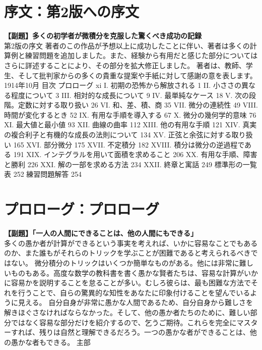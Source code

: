 \documentclass[a4paper,11pt,openany]{ltjsbook}
\begin{document}
\chapter*{序文：第2版への序文}
\noindent\textbf{\large 【副題】多くの初学者が微積分を克服した驚くべき成功の記録}\\[4mm]
第2版の序文
著者のこの作品が予想以上に成功したことに伴い、著者は多くの計算例と練習問題を追加しました。また、経験から有用だと感じた部分についてはさらに詳述することにより、その部分を拡大修正しました。
著者は、教師、学生、そして批判家からの多くの貴重な提案や手紙に対して感謝の意を表します。
1914年10月
\cleardoublepage
目次
プロローグ xi
I. 初期の恐怖から解放される 1
II. 小ささの異なる程度について 3
III. 相対的な成長について 9
IV. 最単純なケース 18
V. 次の段階。定数に対する取り扱い 26
VI. 和、差、積、商 35
VII. 微分の連続性 49
VIII. 時間が変化するとき 52
IX. 有用な手順を導入する 67
X. 微分の幾何学的意味 76
XI. 最大値と最小値 93
XII. 曲線の曲率 112
XIII. 他の有用な手順 121
XIV. 真実の複合利子と有機的な成長の法則について 134
XV. 正弦と余弦に対する取り扱い 165
XVI. 部分微分 175
XVII. 不定積分 182
XVIII. 積分は微分の逆過程である 191
XIX. インテグラルを用いて面積を求めること 206
XX. 有用な手順、障害と勝利 226
XXI. 解の一部を求める方法 234
XXII. 終章と寓話 249
標準形の一覧表 252
練習問題解答 254
\chapter*{プロローグ：プロローグ}
\noindent\textbf{\large 【副題】「一人の人間にできることは、他の人間にもできる」}\\[4mm]
多くの愚か者が計算ができるという事実を考えれば、いかに容易なことでもあるのか、また誰もがそれらのトリックを学ぶことが困難であると考えられるべきではない。
微分積分のトリックはいくつか簡単なものがある。他には非常に難しいものもある。高度な数学の教科書を書く愚かな賢者たちは、容易な計算がいかに容易かを説明することを怠ることが多い。むしろ彼らは、最も困難な方法でそれを行うことで、自らの驚異的な知性をあなたに印象付けることを望んでいるように見える。
自分自身が非常に愚かな人間であるため、自分自身から難しさを解きほぐさなければならなかった。そして、他の愚か者たちのために、難しい部分ではなく容易な部分だけを紹介するので、乞うご期待。これらを完全にマスターすれば、残りは自然と理解できるだろう。一つの愚かな者ができることは、他の愚かな者もできる。
主部
\end{document}
